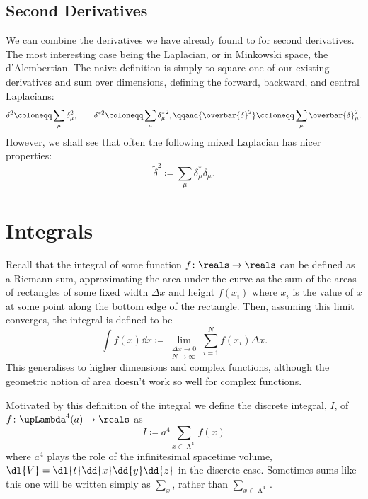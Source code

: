 \documentclass[fleqn]{NotesClass}
\newcommand{\lattice}[1][4]{\upLambda^{#1}}
\newcommand{\forwardDerivative}{\delta}
\newcommand{\backwardDerivative}{\delta^*}
\newcommand{\centralDerivative}{\overbar{\delta}}
\newcommand{\forwardLaplacian}{{\delta^2}}
\newcommand{\backwardLaplacian}{{\delta^{*2}}}
\newcommand{\centralLaplacian}{{\overbar{\delta}^2}}
\newcommand{\mixedLaplacian}{{\widetilde{\delta}^2}}
\begin{document}
    \subsection{Second Derivatives}
    We can combine the derivatives we have already found to for second derivatives.
    The most interesting case being the Laplacian, or in Minkowski space, the d'Alembertian.
    The naive definition is simply to square one of our existing derivatives and sum over dimensions, defining the forward, backward, and central Laplacians:
    \begin{equation}
        \forwardLaplacian \coloneqq \sum_\mu \forwardDerivative_\mu^2, \qquad \backwardLaplacian \coloneqq \sum_\mu {\backwardDerivative_\mu}^2, \qqand \centralLaplacian \coloneqq \sum_\mu \centralDerivative_\mu^2.
    \end{equation}
    However, we shall see that often the following mixed Laplacian has nicer properties:
    \begin{equation}
        \mixedLaplacian \coloneqq \sum_\mu \backwardDerivative_\mu \forwardDerivative_\mu.
    \end{equation}
    
    \section{Integrals}
    Recall that the integral of some function \(f\colon \reals \to \reals\) can be defined as a Riemann sum, approximating the area under the curve as the sum of the areas of rectangles of some fixed width \(\Delta x\) and height \(f(x_i)\) where \(x_i\) is the value of \(x\) at some point along the bottom edge of the rectangle.
    Then, assuming this limit converges, the integral is defined to be
    \begin{equation}
        \int f(x) \dd{x} \coloneqq \lim_{\substack{\Delta x \to 0\\ N \to \infty}} \sum_{i=1}^{N} f(x_i) \Delta x.
    \end{equation}
    This generalises to higher dimensions and complex functions, although the geometric notion of area doesn't work so well for complex functions.
    
    Motivated by this definition of the integral we define the discrete integral, \(I\), of \(f\colon \lattice(a) \to \reals\) as
    \begin{equation}
        I \coloneqq a^4 \sum_{x \in \lattice}f(x)
    \end{equation}
    where \(a^4\) plays the role of the infinitesimal spacetime volume, \(\dl{V} = \dl{t}\dd{x}\dd{y}\dd{z}\) in the discrete case.
    Sometimes sums like this one will be written simply as \(\sum_x\), rather than \(\sum_{x\in\lattice}\).
    
\end{document}
